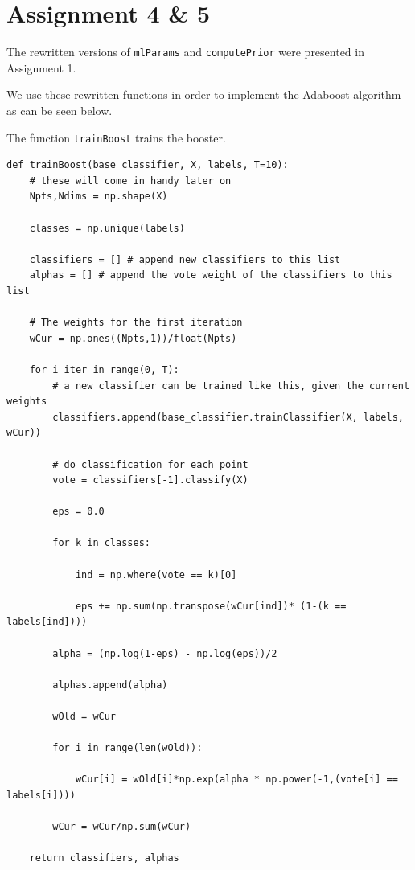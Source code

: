 \documentclass{article}
\begin{document}
\section*{Assignment 4 \& 5}

The rewritten versions of \texttt{mlParams} and \texttt{computePrior} were presented in Assignment 1.

We use these rewritten functions in order to implement the Adaboost algorithm as can be seen below.

The function \texttt{trainBoost} trains the booster.

\begin{lstlisting}
def trainBoost(base_classifier, X, labels, T=10):
    # these will come in handy later on
    Npts,Ndims = np.shape(X)
    
    classes = np.unique(labels)
    
    classifiers = [] # append new classifiers to this list
    alphas = [] # append the vote weight of the classifiers to this list

    # The weights for the first iteration
    wCur = np.ones((Npts,1))/float(Npts)

    for i_iter in range(0, T):
        # a new classifier can be trained like this, given the current weights
        classifiers.append(base_classifier.trainClassifier(X, labels, wCur))

        # do classification for each point
        vote = classifiers[-1].classify(X)
        
        eps = 0.0
        
        for k in classes:
            
            ind = np.where(vote == k)[0]
            
            eps += np.sum(np.transpose(wCur[ind])* (1-(k == labels[ind]))) 
        
        alpha = (np.log(1-eps) - np.log(eps))/2
        
        alphas.append(alpha)
        
        wOld = wCur
        
        for i in range(len(wOld)):
            
            wCur[i] = wOld[i]*np.exp(alpha * np.power(-1,(vote[i] == labels[i])))
        
        wCur = wCur/np.sum(wCur)
        
    return classifiers, alphas
\end{lstlisting}
\end{document}
